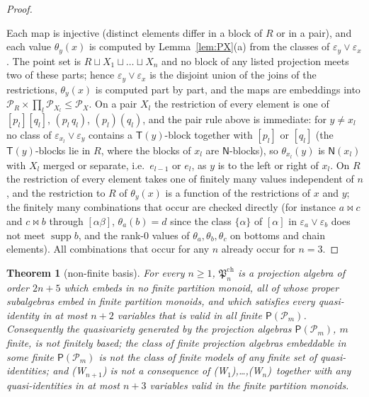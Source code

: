 \documentclass[11pt]{amsart}
\newtheorem{theorem}{Theorem}[section]
\theoremstyle{definition}
\renewcommand{\P}{\mathcal{P}}      %
\newcommand{\PA}{\mathsf{P}}         %
\newcommand{\supp}{\operatorname{supp}}
\newcommand{\T}{\mathsf{T}}
\newcommand{\N}{\mathsf{N}}
\newcommand{\mt}{\bowtie}      %
\newcommand{\Wn}[1][n]{\textup{(W$_{#1}$)}}
\begin{document}
\begin{proof}
\begin{itemize}[nosep]
\end{itemize}
Each map is injective (distinct elements differ in a block of $R$ or in a pair), and each value $\theta_y(x)$ is computed by Lemma~\ref{lem:PX}(a) from the classes of $\varepsilon_y\vee\varepsilon_x$. The point set is $R\sqcup X_1\sqcup\dots\sqcup X_n$ and no block of any listed projection meets two of these parts; hence $\varepsilon_y\vee\varepsilon_x$ is the disjoint union of the joins of the restrictions, $\theta_y(x)$ is computed part by part, and the maps are embeddings into $\P_R\times\prod_l\P_{X_l}\le\P_X$. On a pair $X_l$ the restriction of every element is one of $[p_l][q_l]$, $(p_l\,q_l)$, $(p_l)(q_l)$, and the pair rule above is immediate: for $y\ne x_l$ no class of $\varepsilon_{x_l}\vee\varepsilon_y$ contains a $\T(y)$-block together with $[p_l]$ or $[q_l]$ (the $\T(y)$-blocks lie in $R$, where the blocks of $x_l$ are $\N$-blocks), so $\theta_{x_l}(y)$ is $\N(x_l)$ with $X_l$ merged or separate, i.e.\ $e_{l-1}$ or $e_l$, as $y$ is to the left or right of $x_l$. On $R$ the restriction of every element takes one of finitely many values independent of $n$, and the restriction to $R$ of $\theta_y(x)$ is a function of the restrictions of $x$ and $y$; the finitely many combinations that occur are checked directly (for instance $a\mt c$ and $c\mt b$ through $[\alpha\beta]$, $\theta_a(b)=d$ since the class $\{\alpha\}$ of $[\alpha]$ in $\varepsilon_a\vee\varepsilon_b$ does not meet $\supp b$, and the rank-$0$ values of $\theta_a,\theta_b,\theta_c$ on bottoms and chain elements). All combinations that occur for any $n$ already occur for $n=3$.
\end{proof}

\begin{theorem}[non-finite basis]\label{thm:nfbW}
For every $n\ge1$, $\mathfrak P^{\mathrm{ch}}_n$ is a projection algebra of order $2n+5$ which embeds in no finite partition monoid, all of whose proper subalgebras embed in finite partition monoids, and which satisfies every quasi-identity in at most $n+2$ variables that is valid in all finite $\PA(\P_m)$. Consequently the quasivariety generated by the projection algebras $\PA(\P_m)$, $m$ finite, is not finitely based; the class of finite projection algebras embeddable in some finite $\PA(\P_m)$ is not the class of finite models of any finite set of quasi-identities; and \Wn[n+1] is not a consequence of \Wn[1],\dots,\Wn\ together with any quasi-identities in at most $n+3$ variables valid in the finite partition monoids.
\end{theorem}
\end{document}
